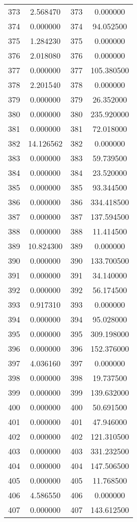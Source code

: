 \documentclass[12pt]{article}
\begin{document}
\begin{longtable}{@{}cccc@{}}
373 & 2.568470 & 373 & 0.000000 \\
374 & 0.000000 & 374 & 94.052500 \\
375 & 1.284230 & 375 & 0.000000 \\
376 & 2.018080 & 376 & 0.000000 \\
377 & 0.000000 & 377 & 105.380500 \\
378 & 2.201540 & 378 & 0.000000 \\
379 & 0.000000 & 379 & 26.352000 \\
380 & 0.000000 & 380 & 235.920000 \\
381 & 0.000000 & 381 & 72.018000 \\
382 & 14.126562 & 382 & 0.000000 \\
383 & 0.000000 & 383 & 59.739500 \\
384 & 0.000000 & 384 & 23.520000 \\
385 & 0.000000 & 385 & 93.344500 \\
386 & 0.000000 & 386 & 334.418500 \\
387 & 0.000000 & 387 & 137.594500 \\
388 & 0.000000 & 388 & 11.414500 \\
389 & 10.824300 & 389 & 0.000000 \\
390 & 0.000000 & 390 & 133.700500 \\
391 & 0.000000 & 391 & 34.140000 \\
392 & 0.000000 & 392 & 56.174500 \\
393 & 0.917310 & 393 & 0.000000 \\
394 & 0.000000 & 394 & 95.028000 \\
395 & 0.000000 & 395 & 309.198000 \\
396 & 0.000000 & 396 & 152.376000 \\
397 & 4.036160 & 397 & 0.000000 \\
398 & 0.000000 & 398 & 19.737500 \\
399 & 0.000000 & 399 & 139.632000 \\
400 & 0.000000 & 400 & 50.691500 \\
401 & 0.000000 & 401 & 47.946000 \\
402 & 0.000000 & 402 & 121.310500 \\
403 & 0.000000 & 403 & 331.232500 \\
404 & 0.000000 & 404 & 147.506500 \\
405 & 0.000000 & 405 & 11.768500 \\
406 & 4.586550 & 406 & 0.000000 \\
407 & 0.000000 & 407 & 143.612500 \\

\end{longtable}
\end{document}
